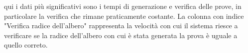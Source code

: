 qui i dati più significativi sono i tempi di generazione e verifica delle prove, in particolare la verifica che rimane praticamente costante. La colonna con indice "Verifica radice dell'albero" rappresenta la velocità con cui il sistema riesce a verificare se la radice dell'albero con cui è stata generata la prova è uguale a quello correto.